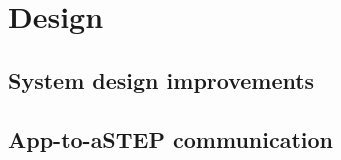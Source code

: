 \section{Design}

\subsection{System design improvements}





\subsection{App-to-aSTEP communication}
